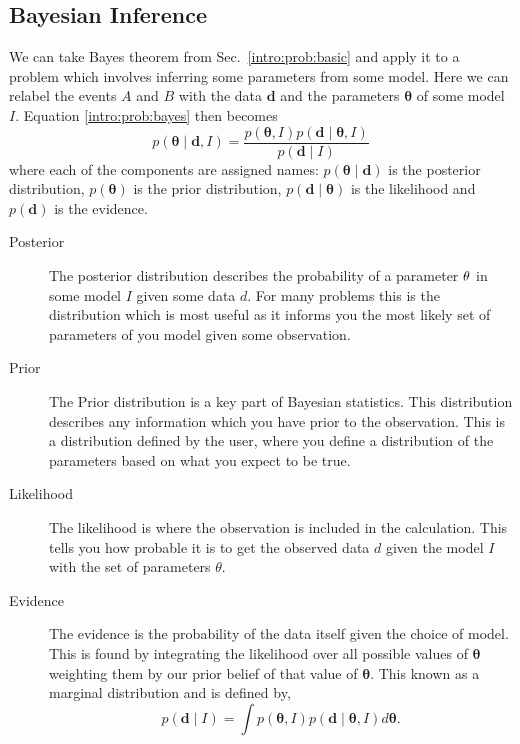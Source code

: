 \subsection{\label{intro:prob:bayes}Bayesian Inference}

We can take Bayes theorem from Sec.~\ref{intro:prob:basic} and apply it to a problem which involves inferring some parameters from some model. Here we can relabel the events $A$ and $B$ with the data ${\bm d}$ and the parameters ${\bm \theta}$ of some model $I$.
Equation \ref{intro:prob:bayes} then becomes
\begin{equation}
\label{intro:bayes:bayes}
p({\bm \theta} \mid {\bm d}, I) = \frac{p({\bm \theta}, I)p({\bm d} \mid {\bm \theta}, I)}{p({\bm d} \mid I)}
\end{equation}
where each of the components are assigned names: $p({\bm \theta} \mid {\bm d})$ is the posterior distribution, $p({\bm \theta})$ is the prior distribution,  $p({\bm d} \mid {\bm \theta})$ is the likelihood and $p({\bm d})$ is the evidence.

\begin{description}
	\item [Posterior]
	The posterior distribution describes the probability of a parameter ${\bf \theta}$ in some model $I$ given some data $d$. For many problems this is the distribution which is most useful as it informs you the most likely set of parameters of you model given some observation.
	\item [Prior]
	The Prior distribution is a key part of Bayesian statistics. This distribution describes any information which you have prior to the observation. This is a distribution defined by the user, where you define a distribution of the parameters based on what you expect to be true.
	\item [Likelihood]
	The likelihood is where the observation is included in the calculation. This tells you how probable it is to get the observed data $d$ given the model $I$ with the set of parameters $\theta$. 
	\item [Evidence]
	The evidence is the probability of the data itself given the choice of model. This is found by integrating the likelihood over all possible values of ${\bm \theta}$ weighting them by our prior belief of that value of ${\bm \theta}$. This known as a marginal distribution and is defined by,
	\begin{equation}
	\label{intro:bayes:evidence}
	p({\bm d} \mid I) = \int p({\bm \theta}, I)p({\bm d} \mid {\bm \theta}, I) d{\bm \theta}.
	\end{equation}
\end{description}


